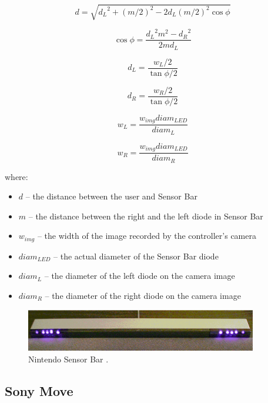 \documentclass{jacsart}
\begin{document}
\begin{equation}d = \sqrt{{d_L}^2 + (m/2)^2 - 2d_L(m/2)^2\cos{\phi}}\end{equation}

\begin{equation}\cos{\phi} = \frac{{d_L}^2m^2 - {d_R}^2}{2md_L}\end{equation}

\begin{equation}d_L = \frac{w_L/2}{\tan{\phi/2}}\end{equation}

\begin{equation}d_R = \frac{w_R/2}{\tan{\phi/2}}\end{equation}

\begin{equation}w_L = \frac{w_{img} \mathit{diam}_{LED}}{\mathit{diam}_L}\end{equation}

\begin{equation}w_R = \frac{w_{img} \mathit{diam}_{LED}}{\mathit{diam}_R}\end{equation}

where:
\begin{itemize}
\item{$d$ – the distance between the user and Sensor Bar}
\item{$m$ – the distance between the right and the left diode in Sensor Bar}
\item{$w_{img}$ – the width of the image recorded by the controller’s camera}
\item{${diam}_{LED}$ – the actual diameter of the Sensor Bar diode}
\item{${diam}_L$ – the diameter of the left diode on the camera image}
\item{${diam}_R$ – the diameter of the right diode on the camera image }
\end{itemize}

\begin{figure}[!t]
\includegraphics[width=0.9\textwidth]{NintendoSensorBar}
\caption{Nintendo Sensor Bar \cite{Jr2011}.}
\label{fig:WiimoteSensorBar}
\end{figure}

\subsection{Sony Move} \label{ssec:move}
\end{document}
